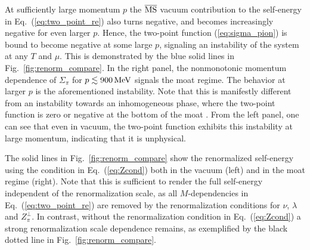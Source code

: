 \documentclass[reprint,english,superscriptaddress,preprintnumbers,amsmath,amssymb,aps,prd]{revtex4-2}
\def\eq#1{(\ref{#1})}
\def\Eq#1{Eq.~(\ref{#1})}
\def\Fig#1{Fig.~\ref{#1}}
\begin{document}
At sufficiently large momentum $p$ the $\overline{\rm MS}$ vacuum contribution to the self-energy in \Eq{eq:two_point_re} also turns negative, and becomes increasingly negative for even larger $p$. Hence, the two-point function \eq{eq:sigma_pion} is bound to become negative at some large $p$, signaling an instability of the system at any $T$ and $\mu$. This is demonstrated by the blue solid lines in \Fig{fig:renorm_compare}. In the right panel, the nonmonotonic momentum dependence of $\Sigma_\pi$ for $p\lesssim 900\, {\rm MeV}$ signals the moat regime. The behavior at larger $p$ is the aforementioned instability. Note that this is manifestly different from an instability towards an inhomogeneous phase, where the two-point function is zero or negative at the bottom of the moat \cite{Fu:2024rto}. From the left panel, one can see that even in vacuum, the two-point function exhibits this instability at large momentum, indicating that it is unphysical.

The solid lines in \Fig{fig:renorm_compare} show the renormalized self-energy using the condition in \Eq{eq:Zcond} both in the vacuum (left) and in the moat regime (right). Note that this is sufficient to render the full self-energy independent of the renormalization scale, as all $M$-dependencies in \Eq{eq:two_point_re} are removed by the renormalization conditions for $\nu$, $\lambda$ and $Z_\pi^\perp$. In contrast, without the renormalization condition in \Eq{eq:Zcond} a strong renormalization scale dependence remains, as exemplified by the black dotted line in \Fig{fig:renorm_compare}.
\end{document}
